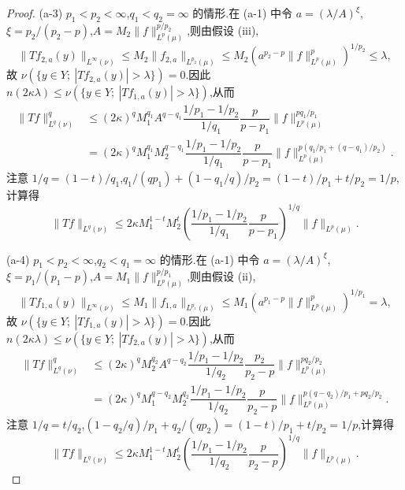 \begin{proof}
(a-3) $p_{1} < p_{2} < \infty$,$q_{1} < q_{2} = \infty$ 的情形.在 (a-1) 中令 $a = (\lambda/A)^{\xi}$,$\xi = p_{2}/(p_{2} - p)$,$A = M_{2}\| f \|_{L^{p}(\mu)}^{p/p_{2}}$,则由假设 (iii),
\begin{equation*}
\| Tf_{2,a}(y) \|_{L^{\infty}(\nu)} \leq M_{2}\| f_{2,a} \|_{L^{p_{2}}(\mu)} \leq M_{2}\left(a^{p_{2}-p}\| f \|_{L^{p}(\mu)}^{p}\right)^{1/p_{2}} \leq \lambda,
\end{equation*}
故 $\nu(\{y \in Y;\ |Tf_{2,a}(y)| > \lambda\}) = 0$.因此 $n(2\kappa\lambda) \leq \nu(\{y \in Y;\ |Tf_{1,a}(y)| > \lambda\})$,从而
\begin{align*}
\| Tf \|_{L^{q}(\nu)}^{q} & \leq (2\kappa)^{q}M_{1}^{q_{1}}A^{q-q_{1}}\dfrac{1/p_{1} - 1/p_{2}}{1/q_{1}}\dfrac{p}{p - p_{1}}\| f \|_{L^{p}(\mu)}^{pq_{1}/p_{1}} \\
& = (2\kappa)^{q}M_{1}^{q_{1}}M_{2}^{q-q_{1}}\dfrac{1/p_{1} - 1/p_{2}}{1/q_{1}}\dfrac{p}{p - p_{1}}\| f \|_{L^{p}(\mu)}^{p(q_{1}/p_{1} + (q-q_{1})/p_{2})}.
\end{align*}
注意 $1/q = (1-t)/q_{1}$,$q_{1}/(qp_{1}) + (1 - q_{1}/q)/p_{2} = (1-t)/p_{1} + t/p_{2} = 1/p$,计算得
\begin{equation*}
\| Tf \|_{L^{q}(\nu)} \leq 2\kappa M_{1}^{1-t}M_{2}^{t}\left(\frac{1/p_{1} - 1/p_{2}}{1/q_{1}}\frac{p}{p - p_{1}}\right)^{1/q}\| f \|_{L^{p}(\mu)}.
\end{equation*}

(a-4) $p_{1} < p_{2} < \infty$,$q_{2} < q_{1} = \infty$ 的情形.在 (a-1) 中令 $a = (\lambda/A)^{\xi}$,$\xi = p_{1}/(p_{1} - p)$,$A = M_{1}\| f \|_{L^{p}(\mu)}^{p/p_{1}}$,则由假设 (ii),
\begin{equation*}
\| Tf_{1,a}(y) \|_{L^{\infty}(\nu)} \leq M_{1}\| f_{1,a} \|_{L^{p_{1}}(\mu)} \leq M_{1}\left(a^{p_{1}-p}\| f \|_{L^{p}(\mu)}^{p}\right)^{1/p_{1}} = \lambda,
\end{equation*}
故 $\nu(\{y \in Y;\ |Tf_{1,a}(y)| > \lambda\}) = 0$.因此 $n(2\kappa\lambda) \leq \nu(\{y \in Y;\ |Tf_{2,a}(y)| > \lambda\})$,从而
\begin{align*}
\| Tf \|_{L^{q}(\nu)}^{q} & \leq (2\kappa)^{q}M_{2}^{q_{2}}A^{q-q_{2}}\dfrac{1/p_{1} - 1/p_{2}}{1/q_{2}}\dfrac{p_{2}}{p_{2} - p}\| f \|_{L^{p}(\mu)}^{pq_{2}/p_{2}} \\
& = (2\kappa)^{q}M_{1}^{q-q_{2}}M_{2}^{q_{2}}\dfrac{1/p_{1} - 1/p_{2}}{1/q_{2}}\dfrac{p}{p_{2} - p}\| f \|_{L^{p}(\mu)}^{p(q-q_{2})/p_{1} + pq_{2}/p_{2}}.
\end{align*}
注意 $1/q = t/q_{2}$,$(1 - q_{2}/q)/p_{1} + q_{2}/(qp_{2}) = (1-t)/p_{1} + t/p_{2} = 1/p$,计算得
\begin{equation*}
\| Tf \|_{L^{q}(\nu)} \leq 2\kappa M_{1}^{1-t}M_{2}^{t}\left(\frac{1/p_{1} - 1/p_{2}}{1/q_{2}}\frac{p}{p_{2} - p}\right)^{1/q}\| f \|_{L^{p}(\mu)}.
\end{equation*}


\end{proof}
